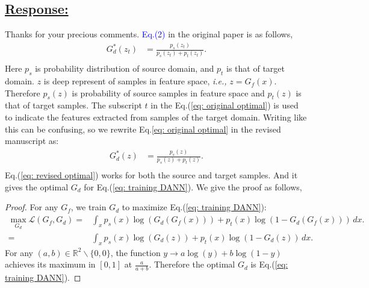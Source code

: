 \subsection*{\underline{\textbf{Response:}}}


Thanks for your precious comments. 
\textcolor{blue}{Eq.(2)} in the original paper is as follows,
\begin{equation}
    \label{eq: original optimal}
    \begin{split}
        G_d^*(z_t) &= \frac{p_s(z_t)}{p_s(z_t)+p_t(z_t)}. \\
    \end{split}
\end{equation}
Here $p_s$ is probability distribution of source domain, and $p_t$ is that of target domain. 
$z$ is deep represent of samples in feature space, \textit{i.e.,} $z=G_f(x).$ 
Therefore $p_s(z)$ is probability of source samples in feature space and $p_t (z)$ is that of target samples. 
The subscript $t$ in the Eq.(\ref{eq: original optimal}) is used to indicate the features extracted from samples of the target domain. 
Writing like this can be confusing, so we rewrite Eq.\ref{eq: original optimal} in the revised manuscript as:
\begin{equation}
    \label{eq: revised optimal}
    \begin{split}
        G_d^*(z) &= \frac{p_s(z)}{p_s(z)+p_t(z)}. \\
    \end{split}
\end{equation}
Eq.(\ref{eq: revised optimal}) works for both the source and target samples. 
And it gives the optimal $G_d$ for Eq.(\ref{eq: training DANN}).
We give the proof as follows, 
\begin{proof}
    For any $G_f$, we train $G_d$ to maximize Eq.(\ref{eq: training DANN}):
    \begin{equation}
        \label{eq: proof optimal discriminator}
        \begin{split}
            \max_{G_d} \mathscr{L}(G_f,G_d)  = &\int_x p_s(x)\log \left(G_d\left(G_f\left(x\right)\right)\right) 
              + p_t(x) \log\left(1-G_d\left(G_f\left(x\right)\right)\right) \, dx.
            \\ = &\int_x p_s(x)\log \left(G_d\left(z\right)\right) 
              + p_t(x) \log\left(1-G_d\left(z\right)\right) \, dx.
        \end{split}
    \end{equation}
    For any $(a,b) \in \mathbb{R}^2 \backslash \{0,0\}$, the function $y \to a\log(y) + b\log(1-y)$ achieves its maximum in $[0,1]$ at $\frac{a}{a+b}$.
    Therefore the optimal $G_d$ is Eq.(\ref{eq: training DANN}).
\end{proof}

